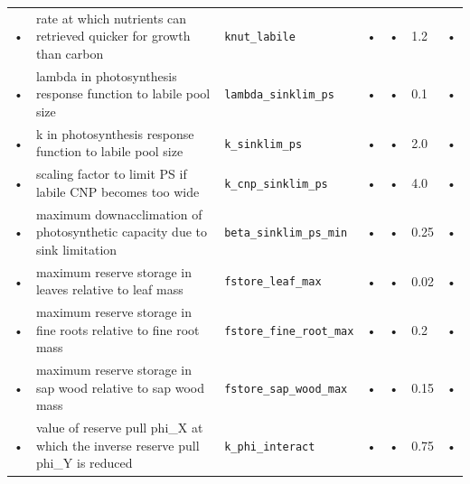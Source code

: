 \begin{table}
\begin{tabularx}{\linewidth}{|c|X|l|l|c|l|c|}
• & rate at which nutrients can retrieved quicker for growth than carbon & \texttt{knut\_labile} & • & • & 1.2 & • \\
• & lambda in photosynthesis response function to labile pool size & \texttt{lambda\_sinklim\_ps} & • & • & 0.1 & • \\
• & k in photosynthesis response function to labile pool size & \texttt{k\_sinklim\_ps} & • & • & 2.0 & • \\
• & scaling factor to limit PS if labile CNP becomes too wide & \texttt{k\_cnp\_sinklim\_ps} & • & • & 4.0 & • \\
• & maximum downacclimation of photosynthetic capacity due to sink limitation & \texttt{beta\_sinklim\_ps\_min} & • & • & 0.25 & • \\
• & maximum reserve storage in leaves relative to leaf mass & \texttt{fstore\_leaf\_max} & • & • & 0.02 & • \\
• & maximum reserve storage in fine roots relative to fine root mass & \texttt{fstore\_fine\_root\_max} & • & • & 0.2 & • \\
• & maximum reserve storage in sap wood relative to sap wood mass & \texttt{fstore\_sap\_wood\_max} & • & • & 0.15 & • \\
• & value of reserve pull phi\_X at which the inverse reserve pull phi\_Y is reduced & \texttt{k\_phi\_interact} & • & • & 0.75 & • \\
\hline 
\end{tabularx}
\end{table}


